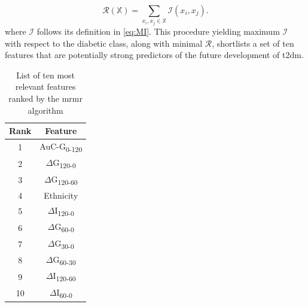 \documentclass[journal,comsoc]{IEEEtran}
\renewcommand{\^}{\hat}  %
\begin{document}
%
\begin{equation}
  \mathcal R(\mathbb X) = \sum \limits_{x_i, x_j \in \mathbb{X}} \mathcal {I}(x_i, x_j).
  \label{eq:R}
\end{equation}
%
where $\mathcal I$ follows its definition in \eqref{eq:MI}. This procedure yielding maximum $\mathcal I$ with respect to the diabetic class, along with minimal $\mathcal R$, shortlists a set of ten features that are potentially strong predictors of the future development of \ac{t2dm}.
%
%
%
\begin{table}[b!]
  \centering
  \renewcommand{\arraystretch}{1.3}
  \caption{List of ten most relevant features ranked by the \ac{mrmr} algorithm}
  \centering
  \begin{tabular}{c c}
    \toprule
    Rank &  Feature\\
    \midrule \midrule
    1 & AuC-G\textsubscript{0-120}\\
    2 & $\Delta$G\textsubscript{120-0}\\
    3 & $\Delta$G\textsubscript{120-60}\\
    4 & Ethnicity \\
    5 & $\Delta$I\textsubscript{120-0}\\
    6 & $\Delta$G\textsubscript{60-0}\\
    7 & $\Delta$G\textsubscript{30-0}\\
    8 & $\Delta$G\textsubscript{60-30}\\
    9 & $\Delta$I\textsubscript{120-60}\\
    10 & $\Delta$I\textsubscript{60-0}\\
    \bottomrule
  \end{tabular}
  \label{tab:ranked}
\end{table}
%
%
\end{document}
